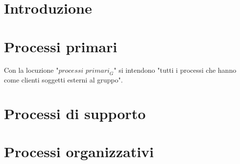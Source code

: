 \documentclass[12pt, oneside]{article}
\begin{document}
\tableofcontents
\newpage
\section{Introduzione}

\newpage

\section{Processi primari}
Con la locuzione "$\textit{processi primari}_G$" si intendono "tutti i processi che hanno come clienti soggetti esterni al gruppo". \\

\newpage

\section{Processi di supporto}


\newpage
\section{Processi organizzativi}

\end{document}
